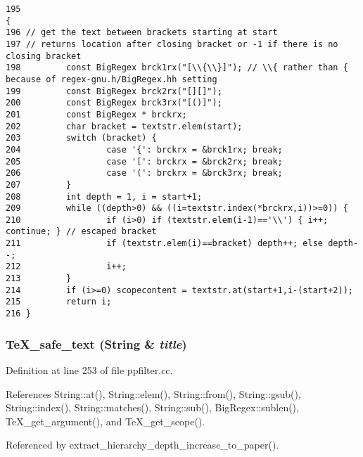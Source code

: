 \footnotesize\begin{verbatim}195                                                                       {
196 // get the text between brackets starting at start
197 // returns location after closing bracket or -1 if there is no closing bracket
198         const BigRegex brck1rx("[\\{\\}]"); // \\{ rather than { because of regex-gnu.h/BigRegex.hh setting
199         const BigRegex brck2rx("[][]");
200         const BigRegex brck3rx("[()]");
201         const BigRegex * brckrx;
202         char bracket = textstr.elem(start);
203         switch (bracket) {
204                 case '{': brckrx = &brck1rx; break;
205                 case '[': brckrx = &brck2rx; break;
206                 case '(': brckrx = &brck3rx; break;
207         }
208         int depth = 1, i = start+1;
209         while ((depth>0) && ((i=textstr.index(*brckrx,i))>=0)) {
210                 if (i>0) if (textstr.elem(i-1)=='\\') { i++; continue; } // escaped bracket
211                 if (textstr.elem(i)==bracket) depth++; else depth--;
212                 i++;
213         }
214         if (i>=0) scopecontent = textstr.at(start+1,i-(start+2));
215         return i;
216 }
\end{verbatim}\normalsize 
{}
\subsubsection{ Te\-X\_\-safe\_\-text ({\bf String} \& {\em title})}\label{dil2al_8hh_a353}




Definition at line 253 of file ppfilter.cc.

References String::at(), String::elem(), String::from(), String::gsub(), String::index(), String::matches(), String::sub(), Big\-Regex::sublen(), Te\-X\_\-get\_\-argument(), and Te\-X\_\-get\_\-scope().

Referenced by extract\_\-hierarchy\_\-depth\_\-increase\_\-to\_\-paper().



